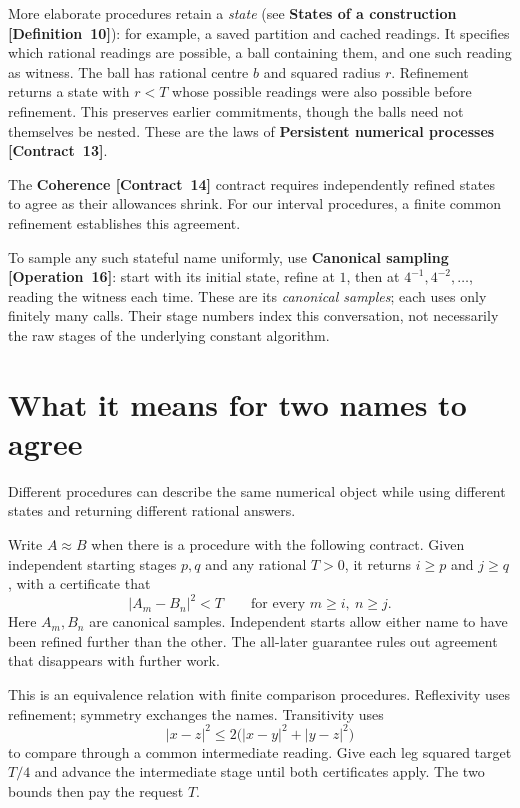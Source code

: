 \documentclass[11pt]{article}
\newcommand{\sq}[1]{\lvert #1\rvert^2}
\newcommand{\entryname}[3]{\textbf{#3 \mbox{[#1~#2]}}}
\begin{document}
More elaborate procedures retain a \emph{state}
(see \entryname{Definition}{10}{States of a construction}): for example, a saved
partition and cached readings. It specifies which rational readings are
possible, a ball containing them, and one such reading as witness. The ball
has rational centre $b$ and squared radius $r$. Refinement returns a state
with $r<T$ whose possible readings were also possible before refinement.
This preserves earlier commitments, though the balls need not themselves
be nested.
These are the laws of \entryname{Contract}{13}{Persistent numerical processes}.

The \entryname{Contract}{14}{Coherence} contract requires independently refined states
to agree as their allowances shrink. For our interval
procedures, a finite common refinement establishes this agreement.

To sample any such stateful name uniformly, use
\entryname{Operation}{16}{Canonical sampling}: start with its initial state,
refine at $1$, then at $4^{-1},4^{-2},\ldots$, reading the witness each time.
These are its \emph{canonical samples}; each uses only finitely many calls.
Their stage numbers index this conversation, not necessarily the raw
stages of the underlying constant algorithm.

\section{What it means for two names to agree}\label{sec:equivalence}

Different procedures can describe the same numerical object while using
different states and returning different rational answers.

Write $A\approx B$ when there is a procedure with the following contract.
Given independent starting stages $p,q$ and any rational $T>0$, it returns
$i\geq p$ and $j\geq q$, with a certificate that
\[
       \sq{A_m-B_n}<T\qquad\text{for every }m\geq i,\ n\geq j.
\]
Here $A_m,B_n$ are canonical samples. Independent starts allow either name
to have been refined further than the other. The all-later guarantee rules
out agreement that disappears with further work.

This is an equivalence relation with finite comparison procedures.
Reflexivity uses refinement; symmetry exchanges the names. Transitivity uses
\[
              \sq{x-z}\leq2\bigl(\sq{x-y}+\sq{y-z}\bigr)
\]
to compare through a common intermediate reading. Give each leg squared
target $T/4$ and advance the intermediate stage until both certificates
apply. The two bounds then pay the request $T$.
\end{document}
